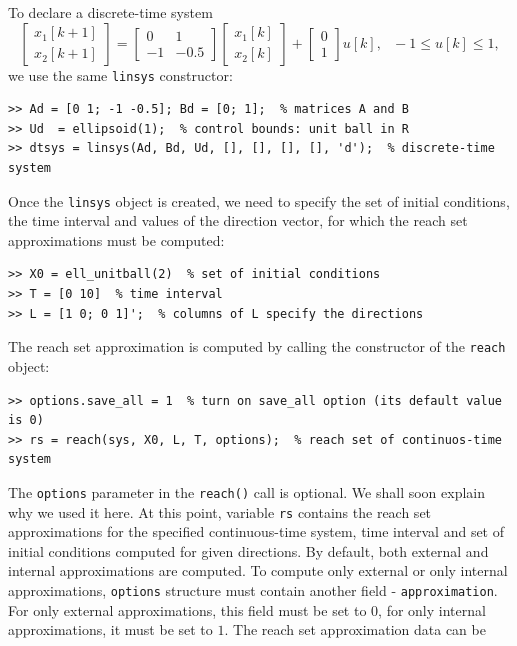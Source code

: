 \documentclass{report}
\begin{document}
To declare a discrete-time system
\[ \left[\begin{array}{c}
x_1[k+1]\\
x_2[k+1]\end{array}\right] = \left[\begin{array}{cc}
0 & 1\\
-1 & -0.5\end{array}\right]\left[\begin{array}{c}
x_1[k]\\
x_2[k]\end{array}\right] + \left[\begin{array}{c}
0\\
1\end{array}\right]u[k], ~~~ -1\leq u[k]\leq 1,\]
we use the same {\tt linsys} constructor:
{\tt \begin{verbatim}
>> Ad = [0 1; -1 -0.5]; Bd = [0; 1];  % matrices A and B
>> Ud  = ellipsoid(1);  % control bounds: unit ball in R
>> dtsys = linsys(Ad, Bd, Ud, [], [], [], [], 'd');  % discrete-time system
\end{verbatim} }
Once the {\tt linsys} object is created, we need to specify the set
of initial conditions, the time interval and values of the direction vector,
for which the reach set approximations must be computed:
{\tt \begin{verbatim}
>> X0 = ell_unitball(2)  % set of initial conditions
>> T = [0 10]  % time interval
>> L = [1 0; 0 1]';  % columns of L specify the directions
\end{verbatim} }
The reach set approximation is computed by calling the constructor
of the {\tt reach} object:
{\tt \begin{verbatim}
>> options.save_all = 1  % turn on save_all option (its default value is 0)
>> rs = reach(sys, X0, L, T, options);  % reach set of continuos-time system
\end{verbatim} }
The {\tt options} parameter in the {\tt reach()} call is optional.
We shall soon explain why we used it here.
At this point, variable {\tt rs} contains the reach set approximations for the
specified continuous-time system, time interval and set of initial conditions
computed for given directions. By default, both external and internal
approximations are computed. To compute only external or only internal
approximations, {\tt options} structure must contain
another field - {\tt approximation}.
For only external approximations, this field
must be set to $0$, for only internal approximations, it must be set to $1$.
The reach set approximation data can be
\end{document}
